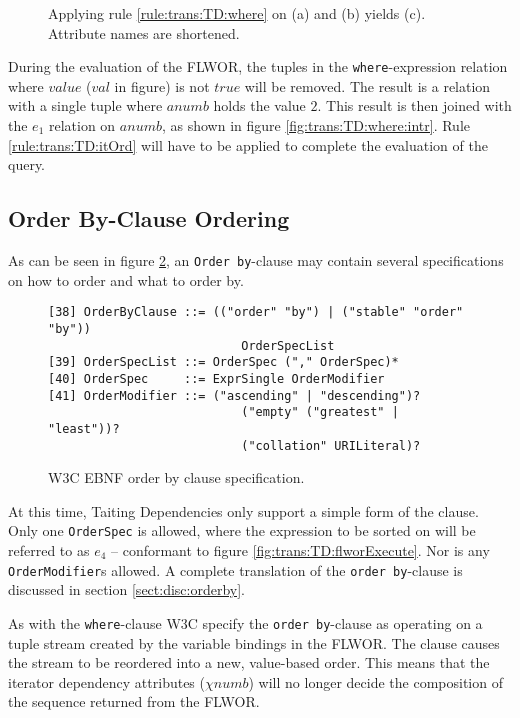 \begin{myExample}
\begin{figure}[h]
\caption[Example: Evaluation of where clause]{Applying rule \ref{rule:trans:TD:where} on (a) and (b)
yields (c). Attribute names are shortened. \label{fig:trans:TD:whereClause}}
\end{figure}

During the evaluation of the FLWOR, the tuples in the \texttt{where}-expression relation where $value$ ($val$ in
figure) is not $true$ will be removed. The result is a relation with a single tuple where $anumb$ holds the value
$2$. This result is then joined with the $e_1$ relation on $anumb$, as shown in figure
\ref{fig:trans:TD:where:intr}. Rule \ref{rule:trans:TD:itOrd} will have to be applied to complete the
evaluation of the query.
\end{myExample}


\subsection{Order By-Clause Ordering}

As can be seen in figure \ref{fig:trans:TD:ordEBNF}, an \texttt{Order by}-clause may contain several
specifications on how to order and what to order by.
\begin{figure}[h]
\begin{Verbatim}
[38] OrderByClause ::= (("order" "by") | ("stable" "order" "by")) 
                           OrderSpecList
[39] OrderSpecList ::= OrderSpec ("," OrderSpec)*
[40] OrderSpec     ::= ExprSingle OrderModifier
[41] OrderModifier ::= ("ascending" | "descending")? 
                           ("empty" ("greatest" | "least"))? 
                           ("collation" URILiteral)?
\end{Verbatim}
\label{fig:trans:TD:ordEBNF}
\caption[W3C EBNF order by clause specification]{W3C EBNF order by clause specification\cite{w3c00}.}
\end{figure}

At this time, Taiting Dependencies only support a simple form of the clause. Only one \texttt{OrderSpec} is
allowed, where the expression to be sorted on will be referred to as $e_4$ -- conformant to figure
\ref{fig:trans:TD:flworExecute}. Nor is any \texttt{OrderModifier}s allowed. A complete translation of the
\texttt{order by}-clause is discussed in section \ref{sect:disc:orderby}.

As with the \texttt{where}-clause W3C specify the \texttt{order by}-clause as operating on a tuple stream created
by the variable bindings in the FLWOR\cite{w3c00}. The clause causes the stream to be reordered into a new,
value-based order. This means that the iterator dependency attributes ($\chi{numb}$) will no longer decide the
composition of the sequence returned from the FLWOR.

